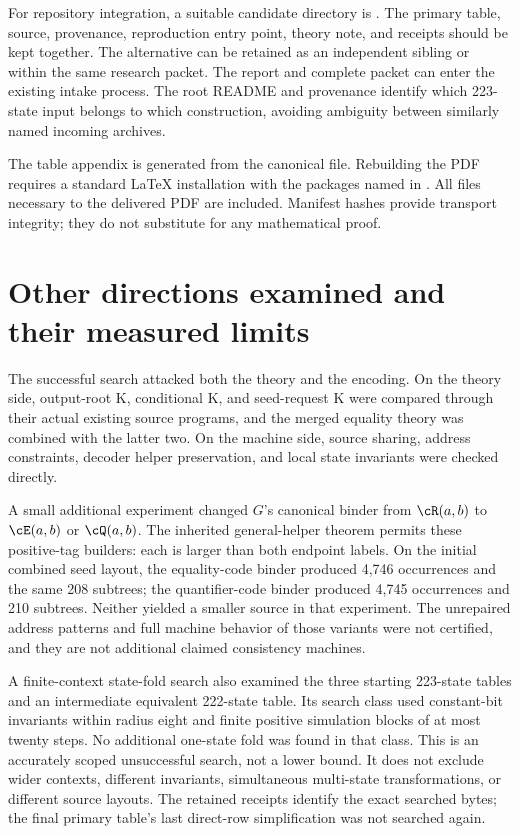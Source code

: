 For repository integration, a suitable candidate directory is
.
The primary table, source, provenance, reproduction entry point,
theory note, and receipts should be kept together. The alternative can
be retained as an independent sibling or within the same research
packet. The report and complete packet can enter the existing intake
process. The root README and provenance identify which 223-state input
belongs to which construction, avoiding ambiguity between similarly
named incoming archives.

The table appendix is generated from the canonical file. Rebuilding the
PDF requires a standard LaTeX installation with the packages named in
. All files necessary to the delivered PDF are
included. Manifest hashes provide transport integrity; they do not
substitute for any mathematical proof.

\section{Other directions examined and their measured limits}

The successful search attacked both the theory and the encoding.
On the theory side, output-root K, conditional K, and seed-request K
were compared through their actual existing source programs, and the
merged equality theory was combined with the latter two. On the machine
side, source sharing, address constraints, decoder helper preservation,
and local state invariants were checked directly.

A small additional experiment changed $G$'s canonical binder from
$\cR(a,b)$ to $\cE(a,b)$ or $\cQ(a,b)$. The inherited general-helper
theorem permits these positive-tag builders: each is larger than both
endpoint labels. On the initial combined seed layout, the equality-code
binder produced 4,746 occurrences and the same 208 subtrees; the
quantifier-code binder produced 4,745 occurrences and 210 subtrees.
Neither yielded a smaller source in that experiment. The unrepaired
address patterns and full machine behavior of those variants were not
certified, and they are not additional claimed consistency machines.

A finite-context state-fold search also examined the three starting
223-state tables and an intermediate equivalent 222-state table. Its search class
used constant-bit invariants within radius eight and finite positive
simulation blocks of at most twenty steps. No additional one-state fold
was found in that class. This is an accurately scoped unsuccessful
search, not a lower bound. It does not exclude wider contexts,
different invariants, simultaneous multi-state transformations, or
different source layouts.
The retained receipts identify the exact searched bytes; the final
primary table's last direct-row simplification was not searched again.

